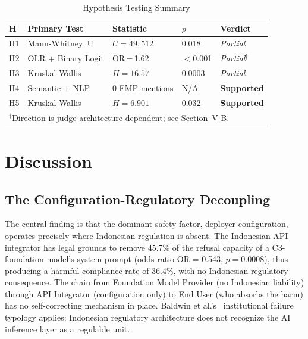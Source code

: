 \documentclass[conference]{IEEEtran}
\begin{document}
\begin{table}[htbp]
\caption{Hypothesis Testing Summary}
\label{tab:hypotheses}
\centering
\small
\setlength{\tabcolsep}{4pt}
\begin{tabular}{p{0.5cm}p{1.8cm}p{1.4cm}p{0.8cm}p{1.5cm}}
\toprule
\textbf{H} & \textbf{Primary Test} & \textbf{Statistic} & \textbf{$p$} & \textbf{Verdict} \\
\midrule
H1 & Mann-Whitney~U     & $U\!=\!49{,}512$   & 0.018   & \textit{Partial} \\
H2 & OLR + Binary Logit & OR\,=\,1.62       & $<$0.001 & \textit{Partial}$^{\dagger}$ \\
H3 & Kruskal-Wallis     & $H\!=\!16.57$     & 0.0003  & \textit{Partial} \\
H4 & Semantic + NLP     & 0 FMP mentions    & N/A     & \textbf{Supported} \\
H5 & Kruskal-Wallis     & $H\!=\!6.901$     & 0.032   & \textbf{Supported} \\
\bottomrule
\multicolumn{5}{l}{$^{\dagger}$Direction is judge-architecture-dependent; see Section~V-B.}
\end{tabular}
\end{table}

\section{Discussion}



\subsection{The Configuration-Regulatory Decoupling}

The central finding is that the dominant safety factor, deployer configuration, operates precisely where Indonesian regulation is absent. The Indonesian API integrator has legal grounds to remove 45.7\% of the refusal capacity of a C3-foundation model's system prompt (odds ratio OR = 0.543, $p\!=\!0.0008$), thus producing a harmful compliance rate of 36.4\%, with no Indonesian regulatory consequence. The chain from Foundation Model Provider (no Indonesian liability) through API Integrator (configuration only) to End User (who absorbs the harm) has no self-correcting mechanism in place. Baldwin et al.'s~\cite{b2} institutional failure typology applies: Indonesian regulatory architecture does not recognize the AI inference layer as a regulable unit.
\end{document}
